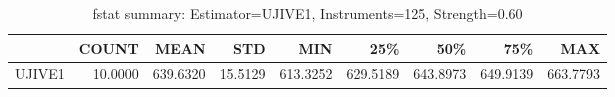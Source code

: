 \begin{table}[ht]
\centering
\caption{fstat summary: Estimator=UJIVE1, Instruments=125, Strength=0.60}
\begin{tabular}{lrrrrrrrr}
\toprule
 & COUNT & MEAN & STD & MIN & 25\% & 50\% & 75\% & MAX \\
\midrule
UJIVE1 & 10.0000 & 639.6320 & 15.5129 & 613.3252 & 629.5189 & 643.8973 & 649.9139 & 663.7793 \\
\bottomrule
\end{tabular}
\end{table}
